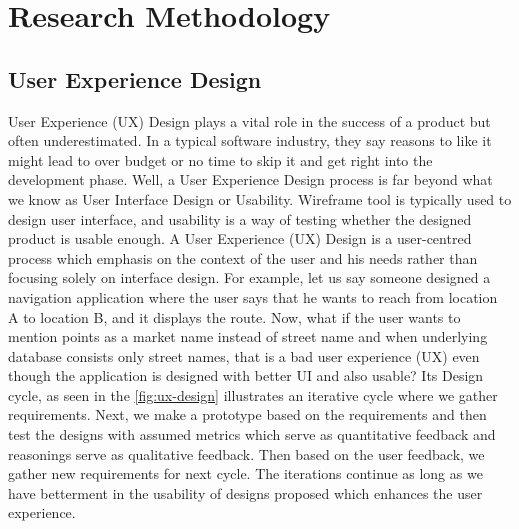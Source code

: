 \chapter{Research Methodology}
\label{ch:researchmethodology_report}

\section{User Experience Design} 
\label{sec:uxd}

User Experience (UX) Design plays a vital role in the success of a product but often underestimated. In a typical software industry, they say reasons to like it might lead to over budget or no time to skip it and get right into the development phase. Well, a User Experience Design process is far beyond what we know as User Interface Design or Usability. Wireframe tool is typically used to design user interface, and usability is a way of testing whether the designed product is usable enough. A User Experience (UX) Design is a user-centred process which emphasis on the context of the user and his needs rather than focusing solely on interface design. \cite{UX} For example, let us say someone designed a navigation application where the user says that he wants to reach from location A to location B, and it displays the route. Now, what if the user wants to mention points as a market name instead of street name and when underlying database consists only street names, that is a bad user experience (UX) even though the application is designed with better UI and also usable? Its Design \cite{UXD} cycle, as seen in the \autoref{fig:ux-design} illustrates an iterative cycle where we gather requirements. Next, we make a prototype based on the requirements and then test the designs with assumed metrics which serve as quantitative feedback and reasonings serve as qualitative feedback. Then based on the user feedback, we gather new requirements for next cycle. The iterations continue as long as we have betterment in the usability of designs proposed which enhances the user experience. \\ \\


